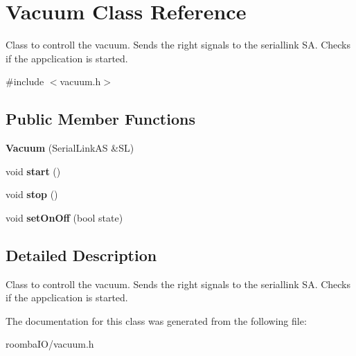 \hypertarget{class_vacuum}{}\section{Vacuum Class Reference}
\label{class_vacuum}


Class to controll the vacuum. Sends the right signals to the seriallink SA. Checks if the appclication is started.  




{\ttfamily \#include $<$vacuum.\+h$>$}

\subsection*{Public Member Functions}
\begin{DoxyCompactItemize}
\item 
\mbox{\label{class_vacuum_a947e6efd83e521eaeb2fad1ed6d6e854}} 
{\bfseries Vacuum} (Serial\+Link\+AS \&SL)
\item 
\mbox{\label{class_vacuum_a54ec5e56215e32d1c3c537ff4794915e}} 
void {\bfseries start} ()
\item 
\mbox{\label{class_vacuum_ab2ec5d94d77af106451046e67aa78a62}} 
void {\bfseries stop} ()
\item 
\mbox{\label{class_vacuum_aea55938cbaba7800040d17f15d676275}} 
void {\bfseries set\+On\+Off} (bool state)
\end{DoxyCompactItemize}


\subsection{Detailed Description}
Class to controll the vacuum. Sends the right signals to the seriallink SA. Checks if the appclication is started. 

The documentation for this class was generated from the following file\+:\begin{DoxyCompactItemize}
\item 
roomba\+I\+O/vacuum.\+h\end{DoxyCompactItemize}
